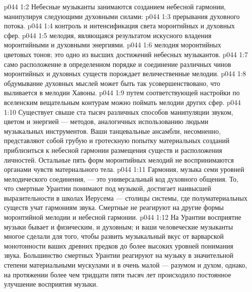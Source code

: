 \vs p044 1:2 Небесные музыканты занимаются созданием небесной гармонии, манипулируя следующими духовными силами:
\vs p044 1:3 \bibnobreakspace {} прерывания духовного потока.
\vs p044 1:4 \pc {}\bibnobreakspace {} контроль и интенсификация света моронтийных и духовных сфер.
\vs p044 1:5 \pc {}\bibnobreakspace {} мелодия, являющаяся результатом искусного владения моронтийными и духовными энергиями.
\vs p044 1:6 \pc {}\bibnobreakspace {} мелодия моронтийных цветовых тонов; это одно из высших достижений небесных музыкантов.
\vs p044 1:7 \pc {}\bibnobreakspace {} само расположение в определенном порядке и соединение различных чинов моронтийных и духовных существ порождает величественные мелодии.
\vs p044 1:8 \pc {}\bibnobreakspace {} обдумывание духовных мыслей может быть так усовершенствовано, что выливается в мелодии Хавоны.
\vs p044 1:9 \pc {}\bibnobreakspace {} путем соответствующей настройки по вселенским вещательным контурам можно поймать мелодии других сфер.
\vs p044 1:10 \pc Существует свыше ста тысяч различных способов манипуляции звуком, цветом и энергией --- методов, аналогичных использованию людьми музыкальных инструментов. Ваши танцевальные ансамбли, несомненно, представляют собой грубую и гротескную попытку материальных созданий приблизиться к небесной гармонии размещения существ и расположения личностей. Остальные пять форм моронтийных мелодий не воспринимаются органами чувств материального тела.
\vs p044 1:11 Гармония, музыка семи уровней мелодического соединения, --- это универсальный код духовного общения. То, что смертные Урантии понимают под музыкой, достигает наивысшей выразительности в школах Иерусема --- столицы системы, где полуматериальных существ учат гармониям звука. Смертные не реагируют на другие формы моронтийной мелодии и небесной гармонии.
\vs p044 1:12 \pc На Урантии восприятие музыки бывает и физическим, и духовным; и ваши человеческие музыканты многое сделали для того, чтобы развить музыкальный вкус от варварской монотонности ваших древних предков до более высоких уровней понимания звука. Большинство смертных Урантии реагируют на музыку в значительной степени материальными мускулами и в очень малой --- разумом и духом, однако, на протяжении более чем тридцати пяти тысяч лет происходило постоянное улучшение восприятия музыки.
